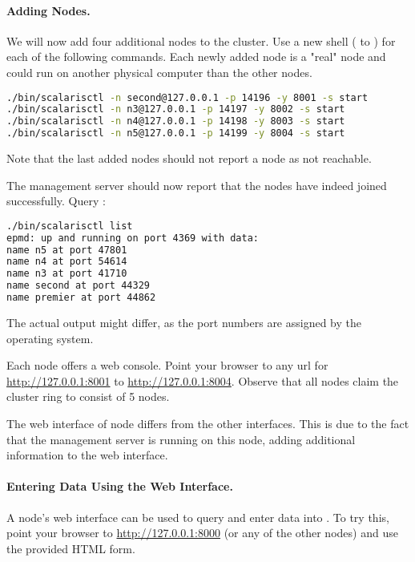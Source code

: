 \paragraph{Adding Nodes.}
\label{par:AddingNodes}

We will now add four additional nodes to the cluster. Use a new shell
( to ) for each of the following commands. Each newly
added node is a "real" \scalaris{} node and could run on another physical
computer than the other nodes.
\begin{lstlisting}[language=sh]
./bin/scalarisctl -n second@127.0.0.1 -p 14196 -y 8001 -s start
./bin/scalarisctl -n n3@127.0.0.1 -p 14197 -y 8002 -s start
./bin/scalarisctl -n n4@127.0.0.1 -p 14198 -y 8003 -s start
./bin/scalarisctl -n n5@127.0.0.1 -p 14199 -y 8004 -s start
\end{lstlisting}
Note that the last added nodes should not report a node as not reachable.

The management server should now report that the nodes have indeed joined
\scalaris{} successfully. Query :
\begin{lstlisting}[language=sh]
./bin/scalarisctl list
epmd: up and running on port 4369 with data:
name n5 at port 47801
name n4 at port 54614
name n3 at port 41710
name second at port 44329
name premier at port 44862
\end{lstlisting}
The actual output might differ, as the port numbers are assigned by the
operating system.

Each node offers a web console. Point your browser to any url for
\url{http://127.0.0.1:8001} to \url{http://127.0.0.1:8004}. Observe that
all nodes claim the cluster ring to consist of 5 nodes.

The web interface of node  differs from the other
interfaces. This is due to the fact that the management server is running on
this node, adding additional information to the web interface.

\paragraph{Entering Data Using the Web Interface.}
A node's web interface can be used to query and enter data into \scalaris{}. To
try this, point your browser to \url{http://127.0.0.1:8000} (or any of the
other nodes) and use the provided HTML form.

